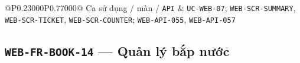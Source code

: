 \begin{longtable}{@{}P{0.23000\SRSWidth}P{0.77000\SRSWidth}@{}}
Ca sử dụng /\allowbreak{} màn /\allowbreak{} \texttt{API} & \texttt{UC-\allowbreak{}WEB-\allowbreak{}07}; \texttt{WEB-\allowbreak{}SCR-\allowbreak{}SUMMARY}, \texttt{WEB-\allowbreak{}SCR-\allowbreak{}TICKET}, \texttt{WEB-\allowbreak{}SCR-\allowbreak{}COUNTER}; \texttt{WEB-\allowbreak{}API-\allowbreak{}055}, \texttt{WEB-\allowbreak{}API-\allowbreak{}057} \\[3pt]
\end{longtable}
\endgroup

\subsection{\texttt{WEB-\allowbreak{}FR-\allowbreak{}BOOK-\allowbreak{}14} — Quản lý bắp nước}
\begingroup
\fontsize{9.5}{12}\selectfont
\setlength{\SRSWidth}{\dimexpr\linewidth-2\tabcolsep\relax}
